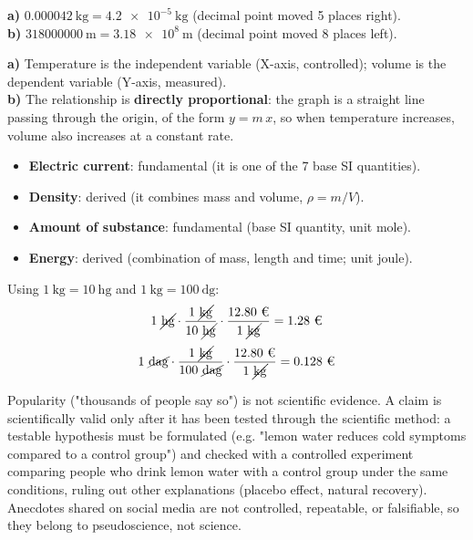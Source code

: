 \documentclass[11pt,a4paper]{article}
\begin{document}
\begin{solucioneng}
\textbf{a)} \( \qty{0.000042}{\kilo\g} = \qty{4.2e-5}{\kilo\g} \) (decimal point moved 5 places right).\\
\textbf{b)} \( \qty{318000000}{\m} = \qty{3.18e8}{\m} \) (decimal point moved 8 places left).
\end{solucioneng}

\begin{solucioneng}
\textbf{a)} Temperature is the independent variable (X-axis, controlled); volume is the dependent variable (Y-axis, measured).\\
\textbf{b)} The relationship is \textbf{directly proportional}: the graph is a straight line passing through the origin, of the form \( y = m\,x \), so when temperature increases, volume also increases at a constant rate.
\end{solucioneng}

\begin{solucioneng}
\begin{itemize}
    \item \textbf{Electric current}: fundamental (it is one of the 7 base SI quantities).
    \item \textbf{Density}: derived (it combines mass and volume, $\rho = m/V$).
    \item \textbf{Amount of substance}: fundamental (base SI quantity, unit mole).
    \item \textbf{Energy}: derived (combination of mass, length and time; unit joule).
\end{itemize}
\end{solucioneng}

\begin{solucioneng}
Using \( \qty{1}{\kg} = \qty{10}{\hecto\g} \) and \( \qty{1}{\kg} = \qty{100}{\deca\g} \):
\[
1\ \cancel{\unit{\hecto\g}} \cdot \dfrac{1\ \cancel{\unit{\kg}}}{10\ \cancel{\unit{\hecto\g}}} \cdot \dfrac{12.80\text{ €}}{1\ \cancel{\unit{\kg}}} = 1.28 \text{ €}
\]
\[
1\ \cancel{\unit{\deca\g}} \cdot \dfrac{1\ \cancel{\unit{\kg}}}{100\ \cancel{\unit{\deca\g}}} \cdot \dfrac{12.80\text{ €}}{1\ \cancel{\unit{\kg}}} = 0.128 \text{ €}
\]
\end{solucioneng}

\begin{solucioneng}
Popularity ("thousands of people say so") is not scientific evidence. A claim is scientifically valid only after it has been tested through the scientific method: a testable hypothesis must be formulated (e.g. "lemon water reduces cold symptoms compared to a control group") and checked with a controlled experiment comparing people who drink lemon water with a control group under the same conditions, ruling out other explanations (placebo effect, natural recovery). Anecdotes shared on social media are not controlled, repeatable, or falsifiable, so they belong to pseudoscience, not science.
\end{solucioneng}
\end{document}
